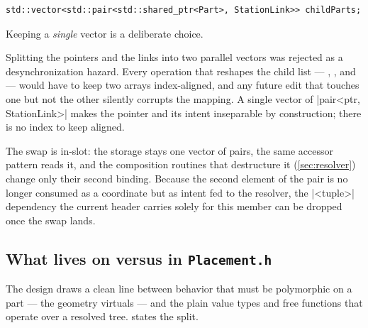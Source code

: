 \begin{listing}[htbp]
\begin{verbatim}
std::vector<std::pair<std::shared_ptr<Part>, StationLink>> childParts;
\end{verbatim}
\caption{The storage swap: the per-child  offset becomes a  of
physical intent, kept in a single vector.}\label{lst:storage}
\end{listing}

Keeping a \emph{single} vector is a deliberate choice.

\begin{rejected}
Splitting the pointers and the links into two parallel vectors was rejected as a desynchronization
hazard. Every operation that reshapes the child list --- ,
, and  --- would have to keep two arrays index-aligned,
and any future edit that touches one but not the other silently corrupts the mapping. A single
vector of \cppinline|pair<ptr, StationLink>| makes the pointer and its intent inseparable by
construction; there is no index to keep aligned.
\end{rejected}

The swap is in-slot: the storage stays one vector of pairs, the same accessor pattern reads it, and
the composition routines that destructure it (\cref{sec:resolver}) change only their second binding.
Because the second element of the pair is no longer consumed as a coordinate but as intent fed to
the resolver, the \cppinline|<tuple>| dependency the current header carries solely for this member
can be dropped once the swap lands.

\subsection{What lives on  versus in \texttt{Placement.h}}\label{sec:datamodel-where}

The design draws a clean line between behavior that must be polymorphic on a part --- the geometry
virtuals --- and the plain value types and free functions that operate over a resolved tree.
 states the split.

